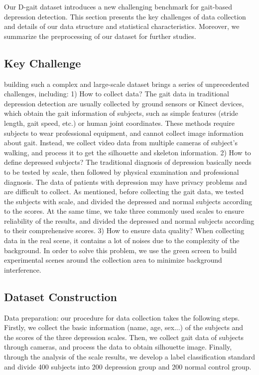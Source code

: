 \documentclass[10pt,twocolumn,letterpaper]{article}
\begin{document}
Our D-gait dataset introduces a new challenging benchmark for gait-based depression detection.
This section presents the key challenges of data collection and details of our data structure and statistical characteristics. Moreover, we summarize the preprocessing of our dataset for further studies.

\subsection{Key Challenge}
building such a complex and large-scale dataset brings a series of unprecedented challenges, including:
1) How to collect data?
The gait data in traditional depression detection are usually collected by ground sensors or Kinect devices, which obtain the gait information of subjects, such as simple features (stride length, gait speed, etc.) or human joint coordinates.
These methods require subjects to wear professional equipment, and cannot collect image information about gait.
Instead, we collect video data from multiple cameras of subject's walking, and process it to get the silhouette and skeleton information.
2) How to define depressed subjects?
The traditional diagnosis of depression basically needs to be tested by scale, then followed by physical examination and professional diagnosis.
The data of patients with depression may have privacy problems and are difficult to collect.
As mentioned, before collecting the gait data, we tested the subjects with scale, and divided the depressed and normal subjects according to the scores.
At the same time, we take three commonly used scales to ensure reliability of the results, and divided the depressed and normal subjects according to their comprehensive scores.
3) How to ensure data quality?
When collecting data in the real scene, it contains a lot of noises due to the complexity of the background.
In order to solve this problem, we use the green screen to build experimental scenes around the collection area to minimize background interference.

\subsection{Dataset Construction}
Data preparation:
our procedure for data collection takes the following steps.
Firstly, we collect the basic information (name, age, sex...) of the subjects and the scores of the three depression scales.
Then, we collect gait data of subjects through cameras, and process the data to obtain silhouette image.
Finally, through the analysis of the scale results, we develop a label classification standard and divide 400 subjects into 200 depression group and 200 normal control group.
\end{document}
